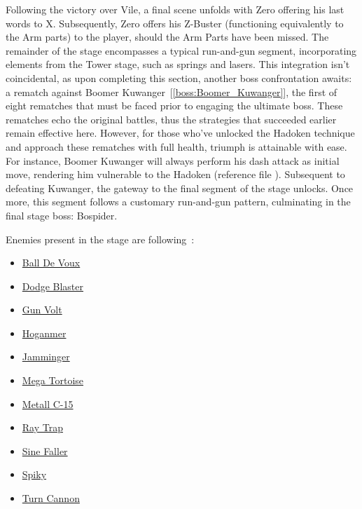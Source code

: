 Following the victory over Vile, a final scene unfolds with Zero offering his last words to X. Subsequently, Zero offers his Z-Buster (functioning equivalently to the Arm parts) to the player, should the Arm Parts have been missed. The remainder of the stage encompasses a typical run-and-gun segment, incorporating elements from the Tower stage, such as springs and lasers. This integration isn't coincidental, as upon completing this section, another boss confrontation awaits: a rematch against Boomer Kuwanger~[\ref{boss:Boomer_Kuwanger}], the first of eight rematches that must be faced prior to engaging the ultimate boss. These rematches echo the original battles, thus the strategies that succeeded earlier remain effective here. However, for those who've unlocked the Hadoken technique and approach these rematches with full health, triumph is attainable with ease. For instance, Boomer Kuwanger will always  perform his dash attack as initial move, rendering him vulnerable to the Hadoken (reference file ). Subsequent to defeating Kuwanger, the gateway to the final segment of the stage unlocks. Once more, this segment follows a customary run-and-gun pattern, culminating in the final stage boss: Bospider.

Enemies present in the stage are following~\cite{wiki:sigma_stages}:
\begin{itemize}
	\item \hyperlink {enem:Ball_De_Voux}{Ball De Voux}
	\item \hyperlink {enem:Dodge_Blaster}{Dodge Blaster}
	\item \hyperlink {enem:Gun_Volt}{Gun Volt}
	\item \hyperlink {enem:Hoganmer}{Hoganmer}
	\item \hyperlink {enem:Jamminger}{Jamminger}
	\item \hyperlink {enem:Mega_Tortoise}{Mega Tortoise}
	\item \hyperlink {enem:Metall_C-15}{Metall C-15}
	\item \hyperlink {enem:Ray_Trap}{Ray Trap}
	\item \hyperlink {enem:Sine_Faller}{Sine Faller}
	\item \hyperlink {enem:Spiky}{Spiky}
	\item \hyperlink {enem:Turn_Cannon}{Turn Cannon}
\end{itemize}

